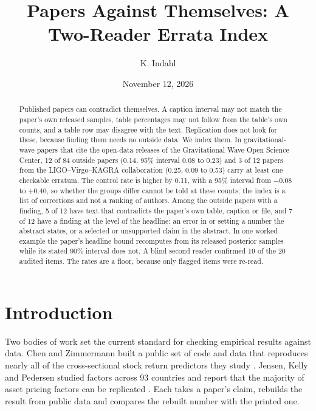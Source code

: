 \documentclass[reprint,amsmath,amssymb,aps,superscriptaddress,nofootinbib]{revtex4-2}
\begin{document}
\title{Papers Against Themselves: A Two-Reader Errata Index}

\author{K. Indahl}

\date{November 12, 2026}

\begin{abstract}
Published papers can contradict themselves. A caption interval may not match the paper's own released samples, table percentages may not follow from the table's own counts, and a table row may disagree with the text. Replication does not look for these, because finding them needs no outside data. We index them. In gravitational-wave papers that cite the open-data releases of the Gravitational Wave Open Science Center, 12 of 84 outside papers (0.14, 95\% interval 0.08 to 0.23) and 3 of 12 papers from the LIGO--Virgo--KAGRA collaboration (0.25, 0.09 to 0.53) carry at least one checkable erratum. The control rate is higher by 0.11, with a 95\% interval from $-0.08$ to $+0.40$, so whether the groups differ cannot be told at these counts; the index is a list of corrections and not a ranking of authors. Among the outside papers with a finding, 5 of 12 have text that contradicts the paper's own table, caption or file, and 7 of 12 have a finding at the level of the headline: an error in or setting a number the abstract states, or a selected or unsupported claim in the abstract. In one worked example the paper's headline bound recomputes from its released posterior samples while its stated 90\% interval does not. A blind second reader confirmed 19 of the 20 audited items. The rates are a floor, because only flagged items were re-read.
\end{abstract}

\maketitle

\section{Introduction}

Two bodies of work set the current standard for checking empirical results against data. Chen and Zimmermann built a public set of code and data that reproduces nearly all of the cross-sectional stock return predictors they study \cite{ChenZimmermann2022}. Jensen, Kelly and Pedersen studied factors across 93 countries and report that the majority of asset pricing factors can be replicated \cite{JKP2023}. Each takes a paper's claim, rebuilds the result from public data and compares the rebuilt number with the printed one.
\end{document}
